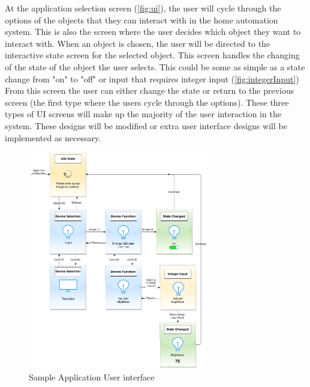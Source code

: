 \documentclass{article}
\begin{document}
At the application selection screen  (\autoref{fig:ui}), the user will cycle through the options of the objects that they can interact with in the home automation system. This is also the screen where the user decides which object they want to interact with. When an object is chosen, the user will be directed to the interactive state screen for the selected object. This screen handles the changing of the state of the object the user selects. This could be some as simple as a state change from "on" to "off" or input that requires integer input (\autoref{fig:integerInput}) From this screen the user can either change the state or return to the previous screen (the first type where the users cycle through the options). These three types of UI screens will make up the majority of the user interaction in the system. These designs will be modified or extra user interface designs will be implemented as necessary. 


\begin{figure}[h!]
	
	\centering
	\includegraphics[width=0.7\textwidth]{ApplicationUI}
	\caption{Sample Application User interface}
	\label{fig:ui}
\end{figure}
\end{document}
